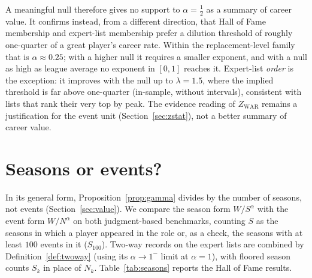 \documentclass[11pt,letterpaper]{article}
\theoremstyle{plain}
\theoremstyle{definition}
\theoremstyle{remark}
\newcommand{\WAR}{\mathrm{WAR}}
\newcommand{\ZWAR}{Z_{\WAR}}
\begin{document}
A meaningful null therefore gives no support to $\alpha = \tfrac12$ as a summary of career value. It confirms instead, from a different direction, that Hall of Fame membership and expert-list membership prefer a dilution threshold of roughly one-quarter of a great player's career rate. Within the replacement-level family that is $\alpha \approx 0.25$; with a higher null it requires a smaller exponent, and with a null as high as league average no exponent in $[0,1]$ reaches it. Expert-list \emph{order} is the exception: it improves with the null up to $\lambda = 1.5$, where the implied threshold is far above one-quarter (in-sample, without intervals), consistent with lists that rank their very top by peak. The evidence reading of $\ZWAR$ remains a justification for the event unit (Section~\ref{sec:zstat}), not a better summary of career value.

\section{Seasons or events?}
\label{app:seasons}

In its general form, Proposition~\ref{prop:gamma} divides by the number of seasons, not events (Section~\ref{sec:value}). We compare the season form $W/S^{\alpha}$ with the event form $W/N^{\alpha}$ on both judgment-based benchmarks, counting $S$ as the seasons in which a player appeared in the role or, as a check, the seasons with at least $100$ events in it ($S_{100}$). Two-way records on the expert lists are combined by Definition~\ref{def:twoway} (using its $\alpha \to 1^-$ limit at $\alpha = 1$), with floored season counts $S_k$ in place of $N_k$. Table~\ref{tab:seasons} reports the Hall of Fame results.
\end{document}
